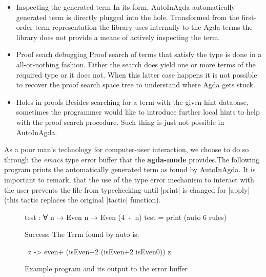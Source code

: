 \documentclass[a4paper]{article}
\begin{document}
\begin{itemize}
    \label {listing:usability}
    \item Inspecting the generated term
      In its form, AutoInAgda automatically generated term is directly plugged
      into the hole. Transformed from the first-order term representation the
      library uses internally to the Agda terms the library does not provide a
      means of actively inspecting the term.
    \item Proof seach debugging
      Proof search of terms that satisfy the type is done in a all-or-nothing
      fashion. Either the search does yield one or more terms of the required
      type or it does not. When this latter case happens it is not possible to
      recover the proof search space tree to understand where Agda gets stuck.
    \item Holes in proofs
      Besides searching for a term with the given hint database, sometimes the
      programmer would like to introduce further local hints to help with the
      proof search procedure. Such thing is just not possible in AutoInAgda.
\end{itemize}

As a poor man's technology for computer-user interaction, we choose to do so
through the \textit{emacs} type error buffer that the \textbf{agda-mode}
provides.The following program prints the automatically generated term as found
by AutoInAgda. It is important to remark, that the use of the type error
mechanism to interact with the user prevents the file from typechecking until
|print| is changed for |apply| (this tactic replaces the original |tactic|
function).

\begin{figure}[h]
\noindent\begin{minipage}{.40\textwidth}
\scriptsize
\begin{code}
  test : ∀ {n} → Even n → Even (4 + n)
  test = print (auto 6 rules)
\end{code}
\end{minipage}
\begin{minipage}{.55\textwidth}
\scriptsize
\begin{code}
Success: The Term found by auto is:

\ z -> even+ (isEven+2 (isEven+2 isEven0)) z
\end{code}
\end{minipage}
  \caption{Example program and its output to the error buffer}
\end{figure}
\end{document}
